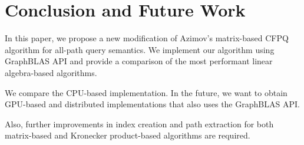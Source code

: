 \section{Conclusion and Future Work}
In this paper, we propose a new modification of Azimov's matrix-based CFPQ algorithm for all-path query semantics. We implement our algorithm using GraphBLAS API and provide a comparison of the most performant linear algebra-based algorithms. %

We compare the CPU-based implementation. In the future, we want to obtain GPU-based and distributed implementations that also uses the GraphBLAS API.

Also, further improvements in index creation and path extraction for both matrix-based and Kronecker product-based algorithms are required.